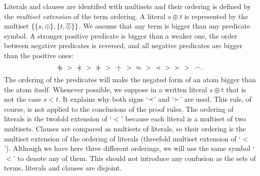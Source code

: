 Literals and clauses are identified with multisets and their ordering is defined by the
{\em multiset extension} \cite{DM} of the term ordering.  
%
A literal $s\oplus t$ is represented by the multiset \(\{\{s,\oplus\},
\{t,\overline{\oplus}\}\}\).  We assume that any term is bigger than any predicate
symbol.  A stronger positive predicate is bigger than a weaker one, the order
between negative predicates is reversed, and all negative predicates are
bigger than the positive ones:
\begin{equation} \label{eq:predicate-order}
\notEq\ >\ \notIncl\ >\ \notCont\ >\ \notInt\ >\ \Eq\ >\ \Incl\ >\ \Cont\ >\
\Int.
\end{equation}
%
The ordering of the predicates will make the negated form of an atom bigger
than the atom itself.  Whenever possible, we suppose in a written literal
$s\oplus t$ that is not the case \(s < t\). It explains why both signs
`$\mathbin{\prec}$' and `$\mathbin{\succ}$' are used. This rule, of course, is not applied to the
conclusions of the proof rules.  The ordering of literals is the twofold
extension of `$<$' because each literal is a multiset of two multisets.
Clauses are compared as multisets of literals, so their ordering is the
multiset extension of the ordering of literals (threefold multiset extension
of `$<$'). Although we have here three different orderings, we will use the
same symbol `$<$' to denote any of them. This should not introduce any
confusion as the sets of terms, literals and clauses are disjoint.

